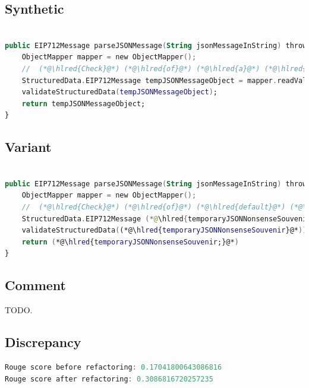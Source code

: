 \documentclass[usenames,dvipsnames]{article} %
\DeclareRobustCommand{\hlred}[1]{{\sethlcolor{pink}\hl{#1}}}
\begin{document}
\subsection{Synthetic}

\begin{lstlisting}[language=kotlin]

public EIP712Message parseJSONMessage(String jsonMessageInString) throws IOException, RuntimeException {
    ObjectMapper mapper = new ObjectMapper();
    //  (*@\hlred{Check}@*) (*@\hlred{of}@*) (*@\hlred{a}@*) (*@\hlred{null}@*) (*@\hlred{string}@*) (*@\hlred{from}@*)
    StructuredData.EIP712Message tempJSONMessageObject = mapper.readValue(jsonMessageInString, EIP712Message.class);
    validateStructuredData(tempJSONMessageObject);
    return tempJSONMessageObject;
}
\end{lstlisting}

\subsection{Variant}

\begin{lstlisting}[language=kotlin]

public EIP712Message parseJSONMessage(String jsonMessageInString) throws IOException, RuntimeException {
    ObjectMapper mapper = new ObjectMapper();
    //  (*@\hlred{Check}@*) (*@\hlred{of}@*) (*@\hlred{default}@*) (*@\hlred{object}@*) object (*@\hlred{from}@*)
    StructuredData.EIP712Message (*@\hlred{temporaryJSONNonsenseSouvenir}@*) = mapper.readValue(jsonMessageInString, EIP712Message.class);
    validateStructuredData((*@\hlred{temporaryJSONNonsenseSouvenir}@*));
    return (*@\hlred{temporaryJSONNonsenseSouvenir;}@*)
}
\end{lstlisting}

\subsection{Comment}

TODO.

\subsection{Discrepancy}

\begin{lstlisting}[language=kotlin]
Rouge score before refactoring: 0.17041800643086816
Rouge score after refactoring: 0.3086816720257235
\end{lstlisting}
\end{document}
